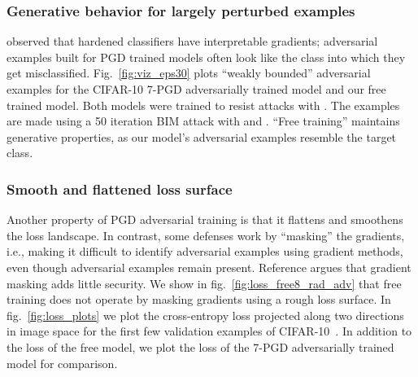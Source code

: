 \documentclass{article}
\begin{document}
\subsubsection*{Generative behavior for largely perturbed examples}
\cite{tsipras2018robustness} observed that hardened classifiers have interpretable gradients; adversarial examples built for PGD trained models often look like the class into which they get misclassified.
Fig.~\ref{fig:viz_eps30} plots ``weakly bounded'' adversarial examples for the CIFAR-10 7-PGD adversarially trained model \citep{madry2017towards} and our free  trained model. Both models were trained to resist  attacks with . The examples are made using a 50 iteration BIM attack with  and .  ``Free training'' maintains generative properties, as our model's adversarial examples resemble the target class.



\subsubsection*{Smooth and flattened loss surface}
Another property of PGD adversarial training is that it flattens and smoothens the loss landscape. In contrast, some defenses work by ``masking'' the gradients, i.e., making it difficult to identify adversarial examples using gradient methods, even though adversarial examples remain present.
Reference \cite{engstrom2018evaluating} argues that gradient masking adds little security. We show in fig.~\ref{fig:loss_free8_rad_adv} that free training does not operate by masking gradients using a rough loss surface.  
In fig.~\ref{fig:loss_plots} we plot the cross-entropy loss projected along two directions in image space for the first few validation examples of CIFAR-10~\citep{li2018visualizing}. In addition to the loss of the free  model, we plot the loss of the 7-PGD adversarially trained model for comparison.
\end{document}
